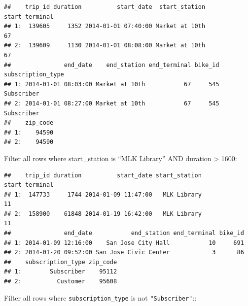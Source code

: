 \documentclass[]{book}
\newenvironment{Shaded}{\begin{snugshade}}{\end{snugshade}}
\newcommand{\DecValTok}[1]{\textcolor[rgb]{0.00,0.00,0.81}{#1}}
\newcommand{\KeywordTok}[1]{\textcolor[rgb]{0.13,0.29,0.53}{\textbf{#1}}}
\newcommand{\NormalTok}[1]{#1}
\newcommand{\OperatorTok}[1]{\textcolor[rgb]{0.81,0.36,0.00}{\textbf{#1}}}
\newcommand{\StringTok}[1]{\textcolor[rgb]{0.31,0.60,0.02}{#1}}
\begin{document}
\begin{verbatim}
##    trip_id duration          start_date  start_station start_terminal
## 1:  139605     1352 2014-01-01 07:40:00 Market at 10th             67
## 2:  139609     1130 2014-01-01 08:08:00 Market at 10th             67
##               end_date    end_station end_terminal bike_id subscription_type
## 1: 2014-01-01 08:03:00 Market at 10th           67     545        Subscriber
## 2: 2014-01-01 08:27:00 Market at 10th           67     545        Subscriber
##    zip_code
## 1:    94590
## 2:    94590
\end{verbatim}

Filter all rows where start\_station is ``MLK Library'' AND duration \textgreater{} 1600:

\begin{Shaded}
\end{Shaded}

\begin{verbatim}
##    trip_id duration          start_date start_station start_terminal
## 1:  147733     1744 2014-01-09 11:47:00   MLK Library             11
## 2:  158900    61848 2014-01-19 16:42:00   MLK Library             11
##               end_date           end_station end_terminal bike_id
## 1: 2014-01-09 12:16:00    San Jose City Hall           10     691
## 2: 2014-01-20 09:52:00 San Jose Civic Center            3      86
##    subscription_type zip_code
## 1:        Subscriber    95112
## 2:          Customer    95608
\end{verbatim}

Filter all rows where \texttt{subscription\_type} is not \texttt{"Subscriber"}::

\begin{Shaded}
\end{Shaded}
\end{document}
